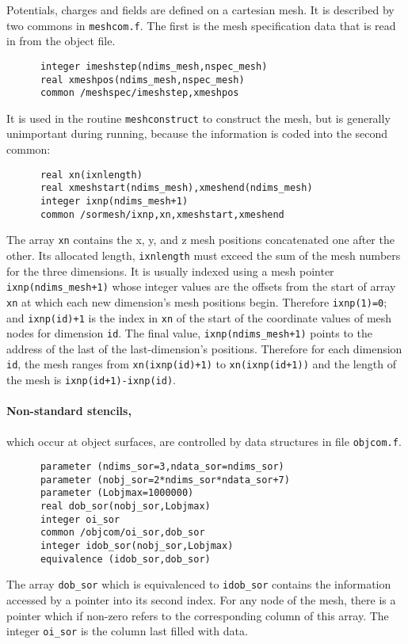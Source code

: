 \documentclass[12pt]{article}
\begin{document}
Potentials, charges and fields are defined on a cartesian mesh. It is
described by two commons in \verb!meshcom.f!. The first is the mesh
specification data that is read in from the object file.
\begin{verbatim}
      integer imeshstep(ndims_mesh,nspec_mesh)
      real xmeshpos(ndims_mesh,nspec_mesh)
      common /meshspec/imeshstep,xmeshpos  
\end{verbatim}
It is used in the routine \verb!meshconstruct! to construct the mesh,
but is generally unimportant during running, because the information
is coded into the second common:
\begin{verbatim}
      real xn(ixnlength)
      real xmeshstart(ndims_mesh),xmeshend(ndims_mesh)
      integer ixnp(ndims_mesh+1)
      common /sormesh/ixnp,xn,xmeshstart,xmeshend
\end{verbatim}

The array \verb!xn! contains the x, y, and z mesh positions
concatenated one after the other. Its allocated length,
\verb!ixnlength! must exceed the sum of the mesh numbers for the three
dimensions. It is usually indexed using a mesh pointer
\verb!ixnp(ndims_mesh+1)! whose integer values are the offsets from
the start of array \verb!xn! at which each new dimension's mesh
positions begin. Therefore \verb!ixnp(1)=0!; and \verb!ixnp(id)+1! is
the index in \verb!xn! of the start of the coordinate values of mesh nodes
for dimension \verb!id!. The final value, \verb!ixnp(ndims_mesh+1)!
points to the address of the last of the last-dimension's
positions. Therefore for each dimension \verb!id!, the mesh ranges
from \verb!xn(ixnp(id)+1)!  to \verb!xn(ixnp(id+1))!  and the length
of the mesh is \verb!ixnp(id+1)-ixnp(id)!.

\paragraph{Non-standard stencils,} which occur at object surfaces,
are controlled by data structures in file \verb!objcom.f!.

\begin{verbatim}
      parameter (ndims_sor=3,ndata_sor=ndims_sor)
      parameter (nobj_sor=2*ndims_sor*ndata_sor+7)
      parameter (Lobjmax=1000000)
      real dob_sor(nobj_sor,Lobjmax)
      integer oi_sor
      common /objcom/oi_sor,dob_sor
      integer idob_sor(nobj_sor,Lobjmax)
      equivalence (idob_sor,dob_sor)
\end{verbatim}
The array \verb!dob_sor! which is equivalenced to \verb!idob_sor!
contains the information accessed by a pointer into its second index.
For any node of the mesh, there is a pointer which if non-zero refers
to the corresponding column of this array. The integer
\verb!oi_sor! is the column last filled with data. 
\end{document}

